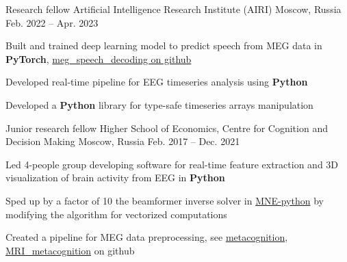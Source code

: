 
\begin{cventries}
  \cventry
    {Research fellow}
    {Artificial Intelligence Research Institute (AIRI)}
    {Moscow, Russia}
    {Feb. 2022 -- Apr. 2023}
    {
      \begin{cvitems}
      \item Built and trained deep learning model to predict speech from MEG data in \textbf{PyTorch},
          \href{https://github.com/dmalt/meg_speech_decoding}{meg\_speech\_decoding on github}
      \item Developed real-time pipeline for EEG timeseries analysis using \textbf{Python}
      \item Developed a \textbf{Python} library for type-safe timeseries arrays manipulation
      \end{cvitems}
    }
  \cventry
    {Junior research fellow}
    {Higher School of Economics, Centre for Cognition and Decision Making}
    {Moscow, Russia}
    {Feb. 2017 -- Dec. 2021}
    {
      \begin{cvitems}
      \item{Led 4-people group developing software for real-time feature extraction and 3D visualization of brain activity from EEG in \textbf{Python}}
      \item{Sped up by a factor of 10 the beamformer inverse solver in \href{https://github.com/mne-tools/mne-python}{MNE-python} by modifying the algorithm for vectorized computations}
      \item{Created a pipeline for MEG data preprocessing, see \href{https://github.com/dmalt/metacognition}{metacognition}, \href{https://github.com/dmalt/MRI_metacognition}{MRI\_metacognition}} on github
      \end{cvitems}
    }

\end{cventries}
